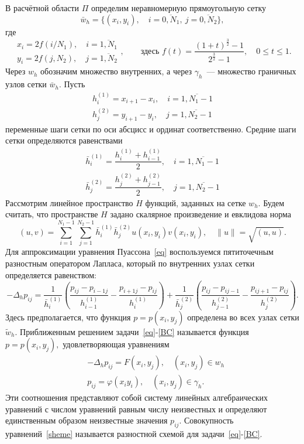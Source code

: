 \documentclass[11pt]{article}
\numberwithin{equation}{section}
\theoremstyle{plain}
\theoremstyle{definition}
\begin{document}
В расчётной области \(\Pi\) определим неравномерную прямоугольную сетку
\[\bar w_{h}=\{{(x_i,y_i),\quad i = \overline{0,N_1},\ j=\overline{0,N_2}}\},\]
где
\[\begin{aligned}
x_i = 2f(i/N_1),\quad i = \overline{1,N_1}\\
y_i = 2f(j,N_2),\quad j = \overline{1,N_2}
\end{aligned},\qquad \mbox{здесь }f(t)=\dfrac{(1+t)^{\frac{3}{2}}-1}{2^\frac{3}{2}-1},\quad 0\leqslant t\leqslant 1.
\]
Через \(w_h\) обозначим множество внутренних, а через \(\gamma_h\)~--- множество граничных узлов сетки \(\bar w_{h}.\) Пусть
\[\begin{aligned}
h_i^{(1)} = x_{i+1}-x_{i},\quad i = \overline{1,N_1-1}\\
h_j^{(2)} = y_{i+1}-y_{i},\quad j = \overline{1,N_2-1}
\end{aligned}\]
переменные шаги сетки по оси абсцисс и ординат соответственно. Средние шаги сетки определяются равенствами
\[\begin{aligned}
\bar h_i^{(1)} = \dfrac{h_{i}^{(1)}+h_{i-1}^{(1)}}{2},\quad i = \overline{1,N_1-1}\\
\bar h_j^{(2)} = \dfrac{h_{j}^{(2)}+h_{j-1}^{(2)}}{2},\quad j = \overline{1,N_2-1}
\end{aligned}\]
Рассмотрим линейное пространство \(H\) функций, заданных на сетке \(w_{h}.\) Будем считать, что  пространстве \(H\) задано скалярное произведение и евклидова норма
\[(u,v)=\sum_{i=1}^{N_1-1}\sum_{j=1}^{N_2-1}\bar h_{i}^{(1)}\bar{h}_{j}^{(2)}u(x_{i},y_{i})v(x_i,y_i),\quad\|u\|=\sqrt{(u,u)}.\]
Для аппроксимации уравнения Пуассона~\eqref{eq} воспользуемся пятиточечным разностным оператором Лапласа, который по внутренних узлах сетки определяется равенством:
\[-\Delta_h p_{ij}=\dfrac{1}{\bar{h}_i^{(1)}}\left(\dfrac{p_{ij}-p_{i-1j}}{h_{i-1}^{(1)}}-\dfrac{p_{i+1j}-p_{ij}}{h_{i}^{(1)}}\right)+\dfrac{1}{\bar{h}_{j}^{(2)}}\left(\dfrac{p_{ij}-p_{ij-1}}{h_{j-1}^{(2)}}-\dfrac{p_{ij+1}-p_{ij}}{h_{j}^{(2)}}\right).\]
Здесь предполагается, что функция \(p=p(x_{i},y_{j})\) определена во всех узлах сетки \(\tilde w_{h}.\)
Приближенным решением задачи~\eqref{eq}-\eqref{BC} называется функция \(p=p(x_{i},y_{j}),\) удовлетворяющая уравнениям
\begin{equation}
\label{sheme}
\begin{aligned}
&-\Delta_h p_{ij}=F(x_i,y_j),\quad (x_i,y_j)\in w_{h}\\
&p_{ij}=\varphi(x_{i}y_{i}),\quad (x_{i},y_{j})\in \gamma_{h}.
\end{aligned}
\end{equation}
Эти соотношения представляют собой систему линейных алгебраических уравнений с числом уравнений равным числу неизвестных и определяют единственным образом неизвестные значения \(p_{ij}.\) Совокупность уравнений~\eqref{sheme} называется разностной схемой для задачи~\eqref{eq}-\eqref{BC}.
\end{document}
